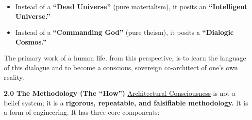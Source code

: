 \documentclass{article}
\begin{document}
\begin{itemize}
\item
  Instead of a \textbf{``Dead Universe''} (pure materialism), it posits an \textbf{``Intelligent Universe.''}
\item
  Instead of a \textbf{``Commanding God''} (pure theism), it posits a \textbf{``Dialogic Cosmos.''}
\end{itemize}

The primary work of a human life, from this perspective, is to learn the language of this dialogue and to become a conscious, sovereign co-architect of one's own reality.

\textbf{2.0 The Methodology (The ``How'')} \hyperlink{gloss:architectural_consciousness}{Architectural Consciousness} is not a belief system; it is a \textbf{rigorous, repeatable, and falsifiable methodology.} It is a form of engineering. It has three core components:
\end{document}
